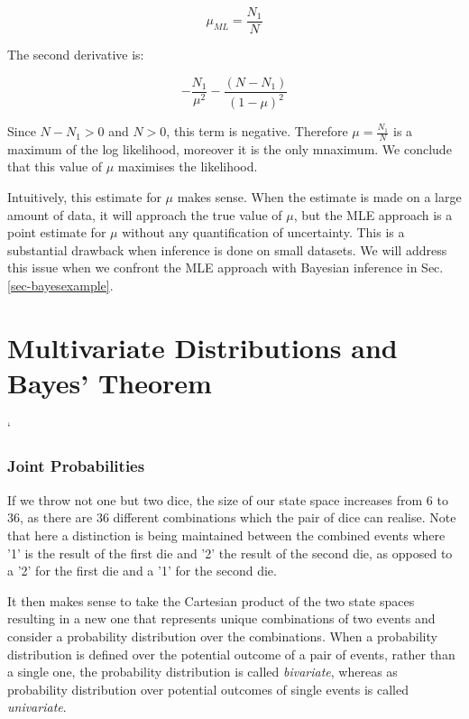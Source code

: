 \begin{equation}
\mu_{ML} = \frac{N_1}{N}
\end{equation}
  

The second derivative is:

$$
-\frac{N_1}{\mu^2} - \frac{(N - N_1)}{(1 - \mu)^2}
$$

Since $N - N_1 > 0$ and $N >0$, this term is negative. Therefore $\mu = \frac{N_1}{N}$ is a maximum of the log likelihood, moreover it is the only mnaximum. We conclude that this value of $\mu$ maximises the likelihood.

Intuitively, this estimate for $\mu$ makes sense. When the estimate is made on a large amount of data, it will approach the true value of $\mu$, but the MLE approach is a point
estimate for $\mu$ without any quantification of uncertainty. This is a substantial drawback when inference is done on small datasets. We will address this issue when we
confront the MLE approach with Bayesian inference in Sec. \ref{sec-bayesexample}.


\chapter{Multivariate Distributions and Bayes' Theorem}

` \subsection{Joint Probabilities}
  If we throw not one but two dice, the size of our state space increases from 6 to 36,
  as there are 36 different combinations which the pair of dice can realise. Note that
  here a distinction is being maintained between the combined events where '1' is the
  result of the first die and '2' the result of the second die, as opposed to
  a '2' for the first die and a '1' for the second die.


  It then
  makes sense to take the Cartesian product of  the two state spaces resulting in a
  new one that represents unique combinations of two events and consider a probability
  distribution over the combinations. When a probability distribution is defined
  over the potential outcome of a pair of events, rather than a single one, the
  probability distribution is called \emph{bivariate},
  whereas as probability distribution over potential outcomes of single events is
  called \emph{univariate}.

